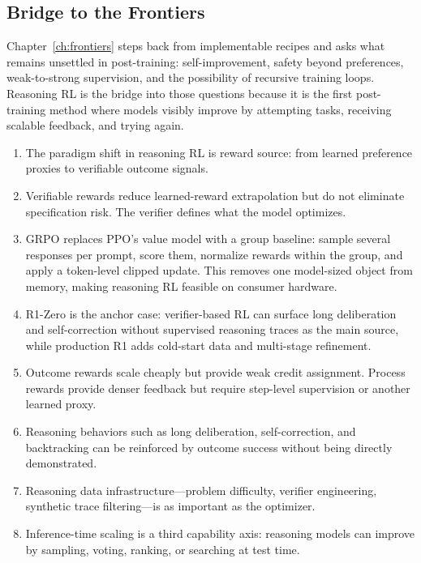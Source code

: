 \subsection{Bridge to the Frontiers}

Chapter~\ref{ch:frontiers} steps back from implementable recipes and asks what remains unsettled in post-training: self-improvement, safety beyond preferences, weak-to-strong supervision, and the possibility of recursive training loops. Reasoning RL is the bridge into those questions because it is the first post-training method where models visibly improve by attempting tasks, receiving scalable feedback, and trying again.



\begin{takeaways}
\begin{enumerate}
  \item The paradigm shift in reasoning RL is reward source: from learned preference proxies to verifiable outcome signals.
  \item Verifiable rewards reduce learned-reward extrapolation but do not eliminate specification risk. The verifier defines what the model optimizes.
  \item GRPO replaces PPO's value model with a group baseline: sample several responses per prompt, score them, normalize rewards within the group, and apply a token-level clipped update. This removes one model-sized object from memory, making reasoning RL feasible on consumer hardware.
  \item R1-Zero is the anchor case: verifier-based RL can surface long deliberation and self-correction without supervised reasoning traces as the main source, while production R1 adds cold-start data and multi-stage refinement.
  \item Outcome rewards scale cheaply but provide weak credit assignment. Process rewards provide denser feedback but require step-level supervision or another learned proxy.
  \item Reasoning behaviors such as long deliberation, self-correction, and backtracking can be reinforced by outcome success without being directly demonstrated.
  \item Reasoning data infrastructure---problem difficulty, verifier engineering, synthetic trace filtering---is as important as the optimizer.
  \item Inference-time scaling is a third capability axis: reasoning models can improve by sampling, voting, ranking, or searching at test time.
\end{enumerate}
\end{takeaways}


